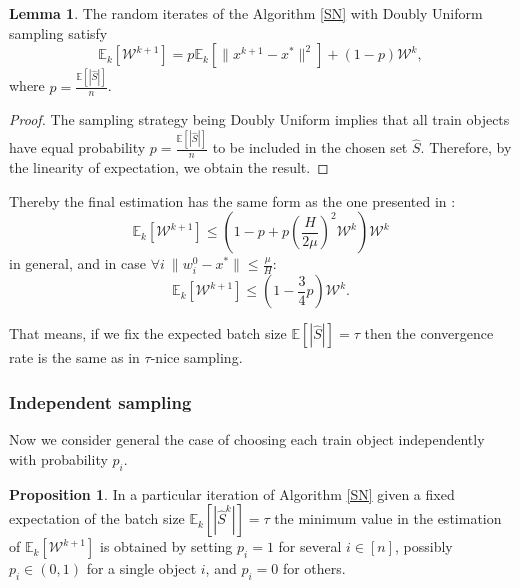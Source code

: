 \documentclass{article}
\theoremstyle{definition}
\theoremstyle{assumption}
\theoremstyle{lemma}
\newtheorem{lemma}{Lemma}
\theoremstyle{theorem}
\theoremstyle{proposition}
\newtheorem{proposition}{Proposition}
\begin{document}
	\begin{lemma} \label{lemma:4}
		The random iterates of the Algorithm \ref{SN} with Doubly Uniform sampling satisfy
		\begin{equation}
			\mathbb E_k[\mathcal W^{k+1}] = p \mathbb E_k[\| x^{k+1} - x^* \|^2] + \left(1 - p \right) \mathcal W^k,
		\end{equation}
	where $p = \frac{\mathbb E[|\hat S|]}{n}$.
	\end{lemma}
	\begin{proof}
		The sampling strategy being Doubly Uniform implies that all train objects have equal probability $p = \frac{\mathbb E[|\hat S|]}{n}$ to be included in the chosen set $\hat S$. Therefore, by the linearity of expectation, we obtain the result.
	\end{proof}
	Thereby the final estimation has the same form as the one presented in \cite{kovalev2019stochastic}:
	\begin{equation}
		\mathbb E_k[\mathcal W^{k+1}] \leqslant \left( 1 - p + p \left( \frac{H}{2\mu} \right)^2 \mathcal W^k \right) \mathcal W^k
	\end{equation}
	in general, and in case $\forall i\ \| w_i^0 - x^* \| \leqslant \frac{\mu}{H}$:
	\begin{equation}
		\mathbb E_k[\mathcal W^{k+1}] \leqslant \left( 1 - \frac{3}{4}p \right) \mathcal W^k.
	\end{equation}

	That means, if we fix the expected batch size $\mathbb E [|\hat S|] = \tau$ then the convergence rate is the same as in $\tau$-nice sampling.
	
	\subsubsection{Independent sampling}
	
	Now we consider general the case of choosing each train object independently with probability $p_i$.
	
	\begin{proposition} \label{proposition:1}
		In a particular iteration of Algorithm \ref{SN} given a fixed expectation of the batch size $\mathbb E_k[|\hat S^k|] = \tau$ the minimum value in the estimation of $\mathbb E_k[\mathcal W^{k+1}]$ is obtained by setting $p_i = 1$ for several $i \in [n]$, possibly $p_i \in (0, 1)$ for a single object $i$, and $p_i = 0$ for others.
	\end{proposition}
\end{document}
